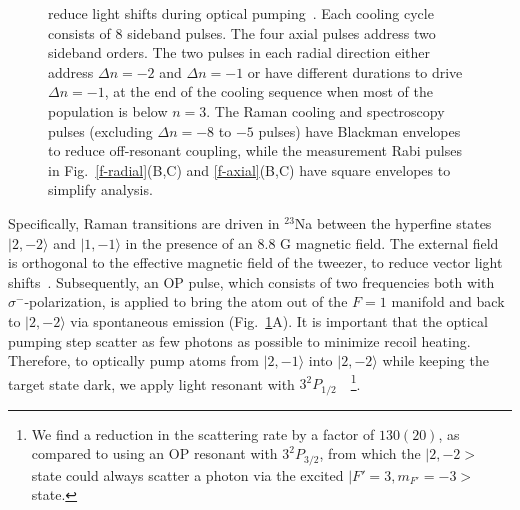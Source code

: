 \documentclass[aps,prl,twocolumn,groupedaddress]{revtex4-1}
\begin{document}
\begin{figure}
{    reduce light shifts during optical pumping~\cite{Hutzler2017-LightShifts}.
    Each cooling cycle consists of $8$ sideband pulses.
    The four axial pulses address two sideband orders.
    The two pulses in each radial direction either address $\Delta n=-2$ and $\Delta n=-1$
    or have different durations to drive $\Delta n=-1$, at the end of the cooling sequence when most of the population is below $n=3$.
    The Raman cooling and spectroscopy pulses (excluding $\Delta n=-8$ to $-5$ pulses) have Blackman envelopes~\cite{Kasevich1992}
    to reduce off-resonant coupling,
    while the measurement Rabi pulses in Fig.~\ref{f-radial}(B,C) and \ref{f-axial}(B,C)
    have square envelopes to simplify analysis.
    \label{f-setup}}
\end{figure}


Specifically, Raman transitions are driven in $^{23}$Na between the hyperfine states
$|2, -2\rangle$ and $|1, -1\rangle$ in the presence of an $8.8$ G magnetic field. The external field is
orthogonal to the effective magnetic field of the tweezer, to reduce vector light shifts~\cite{Kaufman2012,Thompson2013}.
Subsequently, an OP pulse, which consists of two frequencies both with $\sigma^-$-polarization, is applied to bring the atom out of the $F=1$ manifold and back to $|2, -2\rangle$ via spontaneous emission (Fig.~\ref{f-setup}A).
It is important that the optical pumping step scatter as few photons as possible to minimize recoil heating. %
Therefore, to optically pump atoms from $|2,-1\rangle$ into $|2, -2\rangle$ while keeping the target state dark, we apply light resonant with $3^2P_{1/2}$~\cite{Monroe1995, Grobner2017}~\footnote{We find a reduction in the scattering rate by a factor of $130(20)$, as compared to using an OP resonant with $3^2P_{3/2}$, from which the $|2, -2>$ state could always scatter a photon via the excited $|F'=3, m_{F'}=-3>$ state.}.
\end{document}
